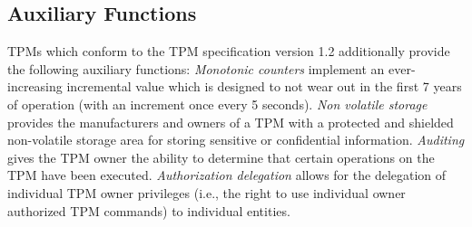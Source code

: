 \documentclass[runningheads]{llncs}
\begin{document}
\subsection{Auxiliary Functions}
TPMs which conform to the TPM specification version 1.2 additionally provide
the following auxiliary functions:
\emph{Monotonic counters} implement an ever-increasing incremental value which
is designed to not wear out in the first 7 years of operation (with an
increment once every 5 seconds).
\emph{Non volatile storage} provides the manufacturers and owners of a TPM
with a protected and shielded non-volatile storage area for storing sensitive
or confidential information.
\emph{Auditing} gives the TPM owner the ability to determine that certain
operations on the TPM have been executed.
\emph{Authorization delegation} allows for the delegation of individual TPM
owner privileges (i.e., the right to use individual owner authorized TPM
commands) to individual entities.
\end{document}
